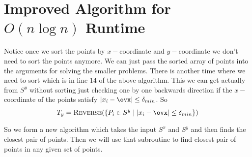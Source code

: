 \section{Improved Algorithm for \texorpdfstring{$O(n\log n)$}{O(nlogn)} Runtime}
Notice once we sort the points by $x-$coordinate and $y-$coordinate we don't need to sort the points anymore. We can just pass the sorted array of points into the arguments for solving the smaller problems. There is another time where we need to sort which is in line 14 of the above algorithm. This we can get actually from $S^y$ without sorting just checking one by one backwards direction if the $x-$coordinate of the points satisfy $|x_i-\ovx|\leq \delta_{min}$. So $$T_y=\textsc{Reverse}(\{P_i\in S^y\mid |x_i-\ovx|\leq \delta_{min}\})$$

So we form a new algorithm which takes the input $S^x$ and $S^y$ and then finds the closest pair of points. Then we will use that subroutine to find closest pair of points in any given set of points.

